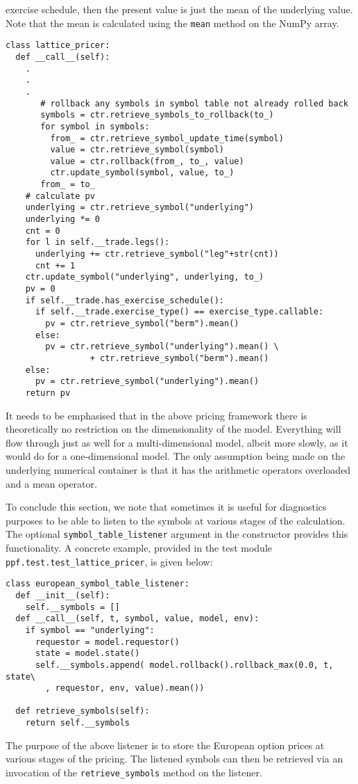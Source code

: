 exercise schedule, then the present value is just the mean of the
underlying value.  Note that the mean is calculated using the
\verb|mean| method on the NumPy array.
\begin{verbatim}
class lattice_pricer:
  def __call__(self):
    .
    .
    .
       # rollback any symbols in symbol table not already rolled back
       symbols = ctr.retrieve_symbols_to_rollback(to_)
       for symbol in symbols:
         from_ = ctr.retrieve_symbol_update_time(symbol)
         value = ctr.retrieve_symbol(symbol)
         value = ctr.rollback(from_, to_, value)
         ctr.update_symbol(symbol, value, to_)
       from_ = to_
    # calculate pv
    underlying = ctr.retrieve_symbol("underlying")
    underlying *= 0
    cnt = 0
    for l in self.__trade.legs():
      underlying += ctr.retrieve_symbol("leg"+str(cnt))         
      cnt += 1
    ctr.update_symbol("underlying", underlying, to_)
    pv = 0
    if self.__trade.has_exercise_schedule():
      if self.__trade.exercise_type() == exercise_type.callable:
        pv = ctr.retrieve_symbol("berm").mean()
      else:
        pv = ctr.retrieve_symbol("underlying").mean() \
                 + ctr.retrieve_symbol("berm").mean()
    else:
      pv = ctr.retrieve_symbol("underlying").mean()
    return pv
\end{verbatim}

It needs to be emphasised that in the above pricing framework there is
theoretically no restriction on the dimensionality of the
model. Everything will flow through just as well for a
multi-dimensional model, albeit more slowly, as it would do for a
one-dimensional model. The only assumption being made on the
underlying numerical container is that it has the arithmetic operators
overloaded and a mean operator.

To conclude this section, we note that sometimes it is useful for
diagnostics purposes to be able to listen to the symbols at various
stages of the calculation. The optional \verb|symbol_table_listener|
argument in the constructor provides this functionality. A concrete
example, provided in the test module
\verb|ppf.test.test_lattice_pricer|, is given below:
\begin{verbatim}
class european_symbol_table_listener:
  def __init__(self):
    self.__symbols = []
  def __call__(self, t, symbol, value, model, env):
    if symbol == "underlying":
      requestor = model.requestor()
      state = model.state()
      self.__symbols.append( model.rollback().rollback_max(0.0, t, state\
        , requestor, env, value).mean())

  def retrieve_symbols(self):
    return self.__symbols  
\end{verbatim} 
The purpose of the above listener is to store the European option
prices at various stages of the pricing. The listened symbols can then
be retrieved via an invocation of the \verb|retrieve_symbols| method
on the listener.


